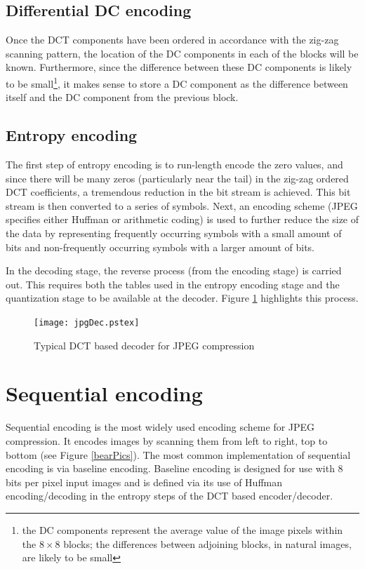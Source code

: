 \documentclass[12pt]{report}
\begin{document}
\subsection{Differential DC encoding} 
Once the DCT components have been ordered in accordance with the zig-zag scanning 
pattern,
the location of the DC components in each of the blocks will be known. 
Furthermore, since the difference between these DC components is likely to be small\footnote{the
DC components represent the average value of the image pixels
within the $8 \times 8$ blocks; the differences between adjoining blocks, in natural images, are likely
to be small}, 
it makes sense to 
store a DC component as the difference between itself and the 
DC component from the previous block.

\subsection{Entropy encoding} 
The first step of entropy encoding is to run-length encode
the zero values, and since there will be many zeros (particularly near the tail)
in the zig-zag ordered DCT 
coefficients, a tremendous reduction in the bit stream is achieved. This bit
stream is then converted to a series of symbols.
Next, an encoding scheme
(JPEG specifies either Huffman or arithmetic coding) is used to further 
reduce the size of the data by representing frequently occurring symbols
with a small amount of bits and non-frequently occurring symbols
with a larger amount of bits. 

In the decoding stage, the reverse process (from the encoding stage) is carried out.
This requires both the tables used in the entropy encoding stage and the 
quantization stage to be available at the decoder. Figure \ref{jpgDec} highlights
this process.

\begin{figure}[htb]
	\begin{center}
		\texttt{[image: jpgDec.pstex]}
		\caption{Typical DCT based decoder for JPEG compression}
		\label{jpgDec}
	\end{center}
\end{figure}

\section{Sequential encoding}
\label{seqEnc}
Sequential encoding is the most widely used encoding scheme 
for JPEG compression.
It encodes 
images by scanning them from left to right, top to bottom (see Figure \ref{bearPics}).
The most common implementation of sequential encoding is via baseline
encoding. Baseline encoding is designed for use with 8 bits per pixel input images and 
is defined via its use of Huffman encoding/decoding in the entropy steps of the DCT 
based encoder/decoder.
\end{document}
